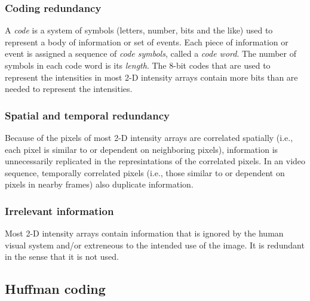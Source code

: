\documentclass[12pt]{article}
\begin{document}
        \subsubsection{Coding redundancy}
            A \emph{code} is a system of symbols (letters, number, bits and the like) used to
            represent a body of information or set of events. Each piece of information or 
            event is assigned a sequence of \emph{code symbols}, called a \emph{code word}.
            The number of symbols in each code word is its \emph{length}. The 8-bit codes that 
            are used to represent the intensities in most 2-D intensity arrays contain more
            bits than are needed to represent the intensities.
        \subsubsection{Spatial and temporal redundancy} 
            Because of the pixels of most 2-D intensity arrays are correlated spatially (i.e.,
            each pixel is similar to or dependent on neighboring pixels), information is
            unnecessarily replicated in the represintations of the correlated pixels. In an
            video sequence, temporally correlated pixels (i.e., those similar to or dependent
            on pixels in nearby frames) also duplicate information.
        \subsubsection{Irrelevant information} 
            Most 2-D intensity arrays contain information that is ignored by the human visual
            system and/or extreneous to the intended use of the image. It is redundant in the
            sense that it is not used.
    \subsection{Huffman coding}
\end{document}
